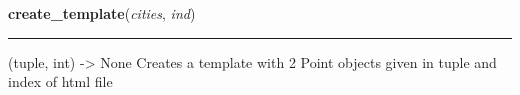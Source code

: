     \label{read_csv:create_template}

    \vspace{0.5ex}

\hspace{.8\funcindent}\begin{boxedminipage}{\funcwidth}

    \raggedright \textbf{create\_template}(\textit{cities}, \textit{ind})

    \vspace{-1.5ex}

    \rule{\textwidth}{0.5\fboxrule}
\setlength{\parskip}{2ex}
    (tuple, int) -{\textgreater} None Creates a template with 2 Point 
    objects given in tuple and  index of html file

\setlength{\parskip}{1ex}
    \end{boxedminipage}

